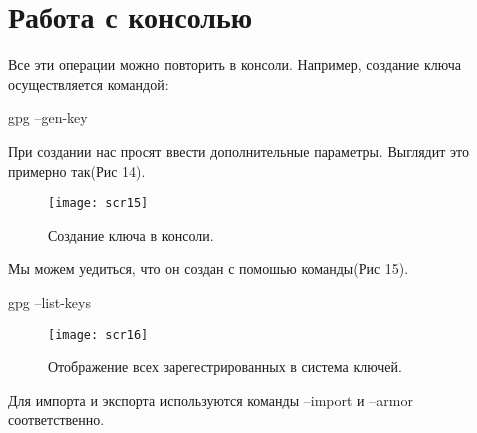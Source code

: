 \documentclass[a4paper,12pt]{article}
\begin{document}
\section[8]{Работа с консолью}
Все эти операции можно повторить в консоли. Например, создание ключа осуществляется командой:
\begin{verbatim*}
	gpg --gen-key
\end{verbatim*}
При создании нас просят ввести дополнительные параметры. Выглядит это примерно так(Рис 14).
\begin{figure}
	\center
	\texttt{[image: scr15]}
	\caption{Создание ключа в консоли.}
\end{figure}
Мы можем уедиться, что он создан с помошью команды(Рис 15).
\begin{verbatim*}
	gpg --list-keys
\end{verbatim*}

\begin{figure}
	\center
	\texttt{[image: scr16]}
	\caption{Отображение всех зарегестрированных в система ключей.}
\end{figure}

Для импорта и экспорта используются команды --import и --armor соответственно.
\end{document}
